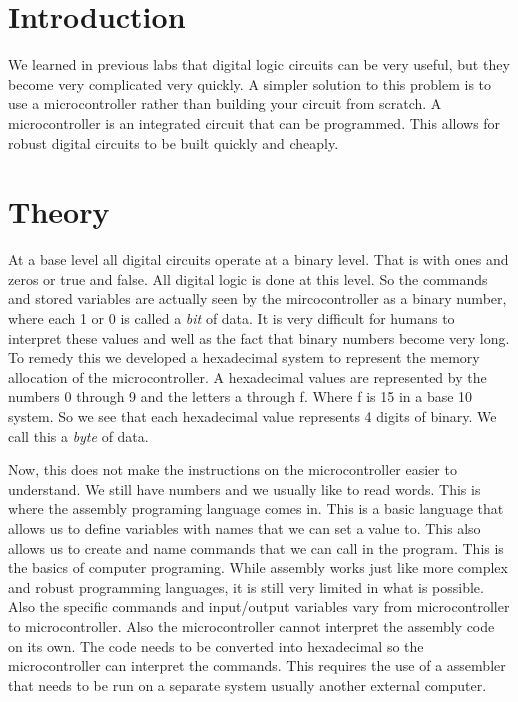 \documentclass[11pt]{article}
\numberwithin{equation}{section}
\numberwithin{figure}{section}
\numberwithin{table}{section}
\begin{document}


\section{Introduction}
We learned in previous labs that digital logic circuits can be very useful, but they become very complicated very quickly. A simpler solution to this problem is to use a microcontroller rather than building your circuit from scratch. A microcontroller is an integrated circuit that can be programmed. This allows for robust digital circuits to be built quickly and cheaply.

\section{Theory}
At a base level all digital circuits operate at a binary level. That is with ones and zeros or true and false. All digital logic is done at this level. So the commands and stored variables are actually seen by the mircocontroller as a binary number, where each 1 or 0 is called a \emph{bit} of data. It is very difficult for humans to interpret these values and well as the fact that binary numbers become very long. To remedy this we developed a hexadecimal system to represent the memory allocation of the microcontroller. A hexadecimal values are represented by the numbers 0 through 9 and the letters a through f. Where f is 15 in a base 10 system. So we see that each hexadecimal value represents 4 digits of binary. We call this a \emph{byte} of data.

Now, this does not make the instructions on the microcontroller easier to understand. We still have numbers and we usually like to read words. This is where the assembly programing language comes in. This is a basic language that allows us to define variables with names that we can set a value to. This also allows us to create and name commands that we can call in the program. This is the basics of computer programing. While assembly works just like more complex and robust programming languages, it is still very limited in what is possible. Also the specific commands and input/output variables vary from microcontroller to microcontroller. Also the microcontroller cannot interpret the assembly code on its own. The code needs to be converted into hexadecimal so the microcontroller can interpret the commands. This requires the use of a assembler that needs to be run on a separate system usually another external computer.
\end{document}
